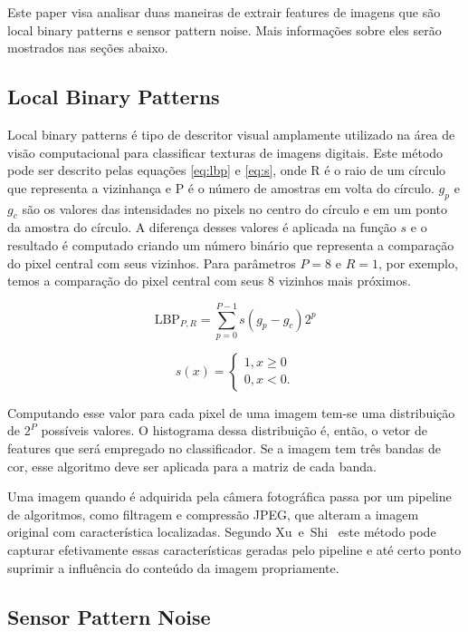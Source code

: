 \documentclass[10pt,twocolumn,letterpaper]{article}
\newcommand{\CITETWO}[3]{\mbox{#1 e #2 \cite{#3}}}
\begin{document}
Este paper visa analisar duas maneiras de extrair features de imagens que são local binary patterns e sensor pattern noise. Mais informações sobre eles serão mostrados nas seções abaixo.

\subsection{Local Binary Patterns}

Local binary patterns é tipo de descritor visual amplamente utilizado na área de visão computacional para classificar texturas de imagens digitais. Este método pode ser descrito pelas equações \ref{eq:lbp} e \ref{eq:s}, onde R é o raio de um círculo que representa a vizinhança e P é o número de amostras em volta do círculo. $g_{p}$ e $g_{c}$ são os valores das intensidades no pixels no centro do círculo e em um ponto da amostra do círculo. A diferença desses valores é aplicada na função $s$ e o resultado é computado criando um número binário que representa a comparação do pixel central com seus vizinhos. Para parâmetros $P=8$ e $R=1$, por exemplo, temos a comparação do pixel central com seus 8 vizinhos mais próximos.

\begin{equation}
	\text{LBP}_{P,R} = \sum_{p=0}^{P-1} s(g_{p} - g_{c}) 2^{p}
	\label{eq:lbp}
\end{equation}

\begin{equation}
	s(x) = \begin{cases} 
		1, x \geq 0 \\
		0, x < 0.	
	\end{cases}
	\label{eq:s}
\end{equation}

Computando esse valor para cada pixel de uma imagem tem-se uma distribuição de $2^P$ possíveis valores. O histograma dessa distribuição é, então, o vetor de features que será empregado no classificador. Se a imagem tem três bandas de cor, esse algoritmo deve ser aplicada para a matriz de cada banda.

Uma imagem quando é adquirida pela câmera fotográfica passa por um pipeline de algoritmos, como filtragem e compressão JPEG, que alteram a imagem original com característica localizadas. Segundo \CITETWO{Xu}{Shi}{Xu_2012} este método pode capturar efetivamente essas características geradas pelo pipeline e até certo ponto suprimir a influência do conteúdo da imagem propriamente.

\subsection{Sensor Pattern Noise}
\end{document}
